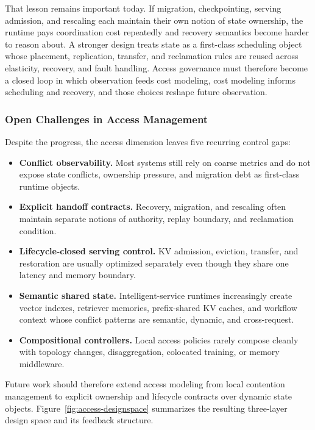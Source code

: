 \documentclass[acmsmall,screen,review]{acmart}
\begin{document}
That lesson remains important today. If migration, checkpointing, serving admission, and rescaling each maintain their own notion of state ownership, the runtime pays coordination cost repeatedly and recovery semantics become harder to reason about. A stronger design treats state as a first-class scheduling object whose placement, replication, transfer, and reclamation rules are reused across elasticity, recovery, and fault handling. Access governance must therefore become a closed loop in which observation feeds cost modeling, cost modeling informs scheduling and recovery, and those choices reshape future observation.



\subsubsection{Open Challenges in Access Management}

Despite the progress, the access dimension leaves five recurring control gaps:
\begin{itemize}[leftmargin=*]
\item \textbf{Conflict observability.} Most systems still rely on coarse metrics and do not expose state conflicts, ownership pressure, and migration debt as first-class runtime objects.
\item \textbf{Explicit handoff contracts.} Recovery, migration, and rescaling often maintain separate notions of authority, replay boundary, and reclamation condition.
\item \textbf{Lifecycle-closed serving control.} KV admission, eviction, transfer, and restoration are usually optimized separately even though they share one latency and memory boundary.
\item \textbf{Semantic shared state.} Intelligent-service runtimes increasingly create vector indexes, retriever memories, prefix-shared KV caches, and workflow context whose conflict patterns are semantic, dynamic, and cross-request.
\item \textbf{Compositional controllers.} Local access policies rarely compose cleanly with topology changes, disaggregation, colocated training, or memory middleware.
\end{itemize} Future work should therefore extend access modeling from local contention management to explicit ownership and lifecycle contracts over dynamic state objects. Figure~\ref{fig:access-designspace} summarizes the resulting three-layer design space and its feedback structure.
\end{document}
